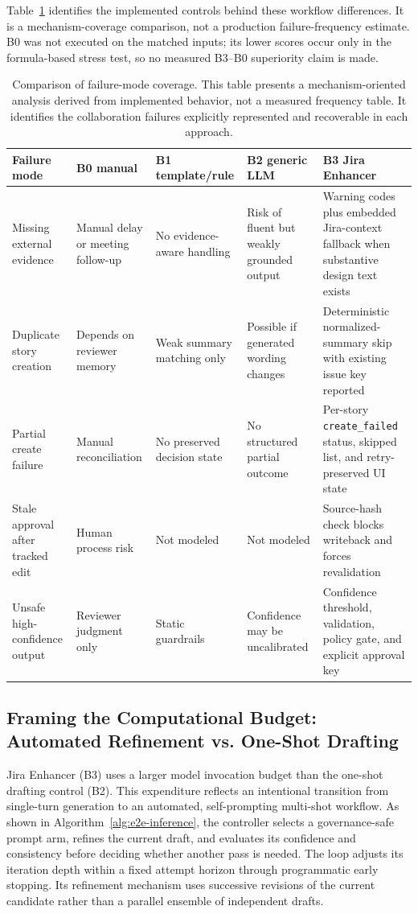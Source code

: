 \documentclass[manuscript,review]{acmart}
\begin{document}
Table~\ref{tab:failure-mode-coverage} identifies the implemented controls behind these workflow differences. It is a mechanism-coverage comparison, not a production failure-frequency estimate. B0 was not executed on the matched inputs; its lower scores occur only in the formula-based stress test, so no measured B3--B0 superiority claim is made.

\begin{table}[t]
\centering
\small
\caption{Comparison of failure-mode coverage. This table presents a mechanism-oriented analysis derived from implemented behavior, not a measured frequency table. It identifies the collaboration failures explicitly represented and recoverable in each approach.}
\label{tab:failure-mode-coverage}
\begin{tabularx}{\textwidth}{@{}p{}p{}p{}p{}X@{}}
\toprule
Failure mode & B0 manual & B1 template/rule & B2 generic LLM & B3 Jira Enhancer \\
\midrule
Missing external evidence & Manual delay or meeting follow-up & No evidence-aware handling & Risk of fluent but weakly grounded output & Warning codes plus embedded Jira-context fallback when substantive design text exists \\
Duplicate story creation & Depends on reviewer memory & Weak summary matching only & Possible if generated wording changes & Deterministic normalized-summary skip with existing issue key reported \\
Partial create failure & Manual reconciliation & No preserved decision state & No structured partial outcome & Per-story \texttt{create\_failed} status, skipped list, and retry-preserved UI state \\
Stale approval after tracked edit & Human process risk & Not modeled & Not modeled & Source-hash check blocks writeback and forces revalidation \\
Unsafe high-confidence output & Reviewer judgment only & Static guardrails & Confidence may be uncalibrated & Confidence threshold, validation, policy gate, and explicit approval key \\
\bottomrule
\end{tabularx}
\end{table}

\subsection{Framing the Computational Budget: Automated Refinement vs. One-Shot Drafting}
Jira Enhancer (B3) uses a larger model invocation budget than the one-shot drafting control (B2). This expenditure reflects an intentional transition from single-turn generation to an automated, self-prompting multi-shot workflow. As shown in Algorithm~\ref{alg:e2e-inference}, the controller selects a governance-safe prompt arm, refines the current draft, and evaluates its confidence and consistency before deciding whether another pass is needed. The loop adjusts its iteration depth within a fixed attempt horizon through programmatic early stopping. Its refinement mechanism uses successive revisions of the current candidate rather than a parallel ensemble of independent drafts.
\end{document}
